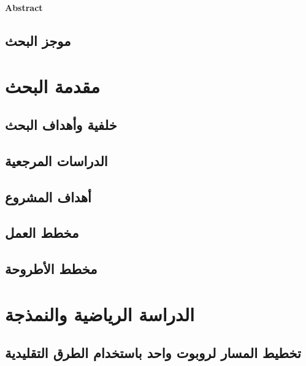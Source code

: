 \documentclass[10pt,a4paper]{book}
\begin{document}
	
	
	
	\begin{english}
		\begin{center}
			\textbf{Abstract}
		\end{center}
			
		\pagebreak
	\end{english}
	
	
	
	\section{موجز البحث}
	
	
	
	\tableofcontents
	
	
	\chapter{مقدمة البحث}
	
	\section{خلفية وأهداف البحث}
	
	\section{الدراسات المرجعية}
	
	
	\section{أهداف المشروع}
	
	
	\section{مخطط العمل}
	
	
	\section{مخطط الأطروحة}
	
	
	
	\chapter{الدراسة الرياضية والنمذجة}
	
	
	\section{تخطيط المسار لروبوت واحد باستخدام الطرق التقليدية}
	
\end{document}
